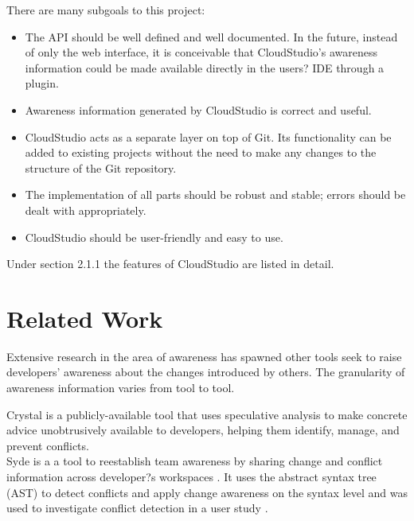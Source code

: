 There are many subgoals to this project:

\begin{itemize}

\item The API should be well defined and well documented. In the future, instead of only the web interface, it is conceivable that CloudStudio's awareness information could be made available directly in the users? IDE through a plugin.
\item Awareness information generated by CloudStudio is correct and useful.
\item CloudStudio acts as a separate layer on top of Git. Its functionality can be added to existing projects without the need to make any changes to the structure of the Git repository.
\item The implementation of all parts should be robust and stable; errors should be dealt with appropriately.
\item CloudStudio should be user-friendly and easy to use.

\end{itemize}

Under section 2.1.1 the features of CloudStudio are listed in detail.







\section{Related Work}




Extensive research in the area of awareness has spawned other tools seek to raise developers' awareness about the changes introduced by others. The granularity of awareness information varies from tool to tool.

Crystal is a publicly-available tool that uses speculative analysis to make concrete advice unobtrusively available to developers, helping them identify, manage, and prevent conflicts. \cite{ref25} \\

Syde is a a tool to reestablish team awareness by sharing change and conflict information across developer?s workspaces \cite{ref23}. It uses the abstract syntax tree (AST) to detect conflicts and apply change awareness on the syntax level and was used to investigate conflict detection in a user study \cite{ref24}. \\


